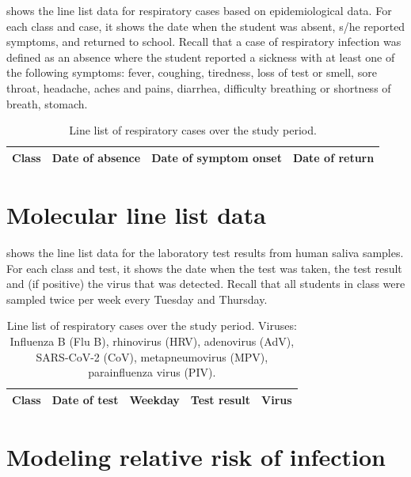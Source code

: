 \documentclass[fleqn,11pt]{wlscirep_supp}
\begin{document}
 shows the line list data for respiratory cases based on epidemiological data. For each class and case, it shows the date when the student was absent, s/he reported symptoms, and returned to school. Recall that a case of respiratory infection was defined as an absence where the student reported a sickness with at least one of the following symptoms: fever, coughing, tiredness, loss of test or smell, sore throat, headache, aches and pains, diarrhea, difficulty breathing or shortness of breath, stomach.

{\footnotesize\begin{longtable}{l l l l}
    \caption[Line list of respiratory cases over the study period]{Line list of respiratory cases over the study period.}\label{tab:epi-data-line-list} \\
    \toprule
    Class & Date of absence & Date of symptom onset & Date of return \\
    \midrule
    
    \bottomrule
\end{longtable}}

\clearpage

\section{Molecular line list data}\label{sec:mol-data}

 shows the line list data for the laboratory test results from human saliva samples. For each class and test, it shows the date when the test was taken, the test result and (if positive) the virus that was detected. Recall that all students in class were sampled twice per week every Tuesday and Thursday. 

{\footnotesize\begin{longtable}{l l l l l}
    \caption[Line list of molecular test results over the study period]{Line list of respiratory cases over the study period. Viruses: Influenza B (Flu B), rhinovirus (HRV), adenovirus (AdV), SARS-CoV-2 (CoV), metapneumovirus (MPV), parainfluenza virus (PIV).}\label{tab:mol-data-line-list} \\
    \toprule
    Class & Date of test & Weekday & Test result & Virus \\
    \midrule
    
    \bottomrule
\end{longtable}}

\clearpage

\section{Modeling relative risk of infection}\label{sec:transmission-model}
\end{document}
